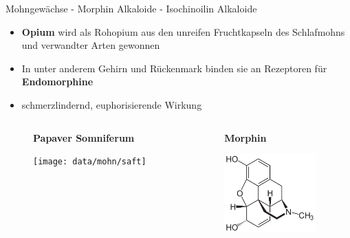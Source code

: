 \begin{frame}[t,label=mohn]{Mohngewächse - Morphin Alkaloide - Isochinoilin Alkaloide }
  \begin{itemize}
    \item \textbf{Opium} wird als Rohopium aus den unreifen Fruchtkapseln des
      Schlafmohns und verwandter Arten gewonnen
    \item In unter anderem Gehirn und Rückenmark binden sie an Rezeptoren für
      \textbf{Endomorphine}
    \item schmerzlindernd, euphorisierende Wirkung
  \end{itemize}
  \begin{columns}[onlytextwidth,t]
    \begin{column}{0.6\textwidth}
      \begin{minipage}[c][0.9\textheight][l]{\linewidth}
        \begin{figure}
          \textbf{\tiny Papaver Somniferum}\par\medskip
        \texttt{[image: data/mohn/saft]}%
        \end{figure}
      \end{minipage}
   \end{column}
    \begin{column}{0.4\textwidth}
      \begin{minipage}[c][0.9\textheight][l]{\linewidth}
        \begin{figure}
          \textbf{\tiny Morphin}\par\medskip
        \includegraphics[height=3cm]{data/mohn/morphine}%
        \end{figure}
      \end{minipage}
    \end{column}
  \end{columns}
  \end{frame}


